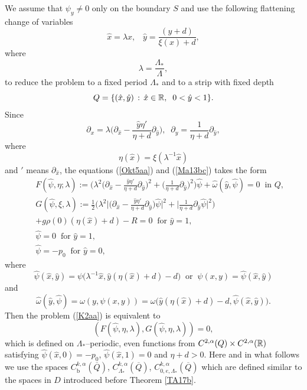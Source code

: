 \documentclass[a4paper,reqno,12pt]{amsart}
\theoremstyle{plain}
\theoremstyle{definition}
\numberwithin{equation}{section}
\begin{document}
We assume that $\psi_y\neq 0$ only on the boundary $S$
and  use the following flattening change of variables
\begin{equation}\label{M11b}
\hat{x}=\lambda x,\;\;\;\hat{y}=\frac{(y+d)}{\xi(x)+d},
\end{equation}
where
\begin{equation}\label{M11ba}
\lambda=\frac{\Lambda_*}{\Lambda},
\end{equation}
to reduce the problem to a fixed period $\Lambda_*$ and to a  strip with fixed depth
$$
Q=\{(\hat{x},\hat{y})\,:\,\hat{x}\in \Bbb R,\;\;0<\hat{y}<1\}.
$$
Since
$$
\partial_x=\lambda\Big(\partial_{\hat{x}}-\frac{\hat{y}\eta'}{\eta+d}\partial_{\hat{y}}
\Big),\;\;\partial_y=\frac{1}{\eta+d}\partial_{\hat{y}},
$$
where
$$
\eta(\hat{x})=\xi (\lambda^{-1}\hat{x})
$$
and $'$ means $\partial_{\hat{x}}$,
the equations (\ref{Okt5aa}) and  (\ref{Ma13bc}) takes the form
\begin{eqnarray}\label{K2aa}
&&F(\hat{\psi},\eta;\lambda):=\Big(\lambda^2\Big(\partial_{\hat{x}}-\frac{\hat{y}\eta'}{\eta+d}
\partial_{\hat{y}}\Big)^2+\Big(\frac{1}{\eta+d}\partial_{\hat{y}}\Big)^2\Big)
\hat{\psi}+\hat{\omega}(\hat{y},\hat{\psi})=0\;\;\mbox{in $Q$},\nonumber\\
&&G(\hat{\psi},\xi,\lambda):=\frac{1}{2}\Big(\lambda^2\Big|\Big(\partial_{\hat{x}}-
\frac{\hat{y}\eta'}{\eta+d}\partial_{\hat{y}}\Big)\hat{\psi}\Big|^2
+\Big|\frac{1}{\eta+d}\partial_{\hat{y}}\hat{\psi}\Big|^2\Big)\nonumber\\
&&+g\rho(0)(\eta(\hat{x})+d)-R=0\;\;\mbox{for $\hat{y}=1$},\nonumber\\
&&\hat{\psi}=0\;\;\mbox{for $\hat{y}=1$},\nonumber\\
&&\hat{\psi}=-p_0\;\;\mbox{for $\hat{y}=0$},
\end{eqnarray}
where
$$
\hat{\psi}(\hat{x},\hat{y})=\psi\Big(\lambda^{-1}\hat{x},
\hat{y}(\eta(\hat{x})+d)-d\Big)
\;\;\mbox{or}\;\;\psi(x,y)=\hat{\psi}(\hat{x},\hat{y})
$$
and
$$
\hat{\omega}(\hat{y},\hat{\psi})=\omega(y,\psi(x,y))=\omega\Big(
\hat{y}(\eta(\hat{x})+d)-d,\hat{\psi}(\hat{x},\hat{y})\Big).
$$
Then the problem (\ref{K2aa}) is equivalent to
\begin{equation}\label{Ma31aa}
(F(\hat{\psi},\eta,\lambda),G(\hat{\psi},\eta,\lambda))=0,
\end{equation}
which is defined on $\Lambda_*$--periodic, even functions from
$C^{2,\alpha}(Q)\times C^{2,\alpha}(\Bbb R)$  satisfying $\hat{\psi}(\hat{x},0)=-p_0$,
$\hat{\psi}(\hat{x},1)=0$ and $\eta+d>0$.
Here and in what follows we use the spaces $C^{k,\alpha}_{\textrm{b}}(\overline{Q})$, $C^{k,\alpha}_{\Lambda_*}(\overline{Q})$,
$C^{k,\alpha}_{0,e,\Lambda_*}(\overline{Q})$ which are defined similar to the spaces in $D$ introduced before Theorem \ref{TA17b}.
\end{document}
